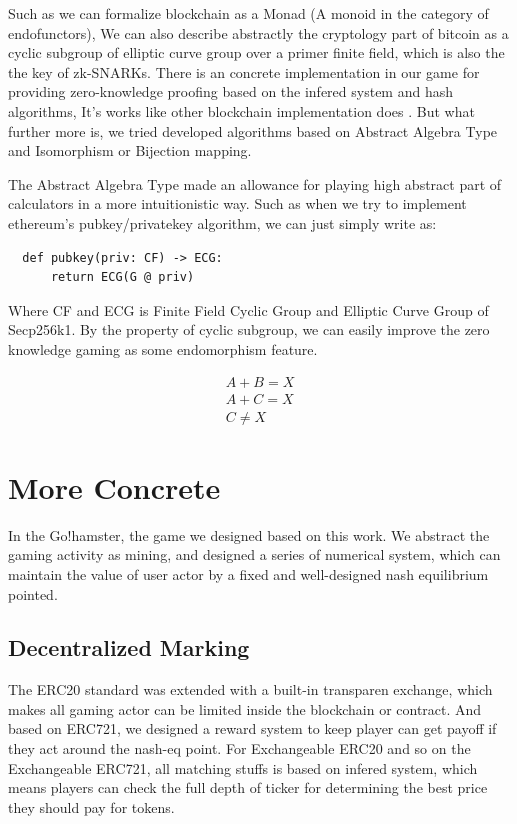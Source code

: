 \documentclass[twocolumn]{article}
\begin{document}
Such as we can formalize blockchain as a Monad (A monoid in the category of endofunctors), We can also describe abstractly the cryptology part of bitcoin as a cyclic subgroup of elliptic curve group over a primer finite field, which is also the the key of zk-SNARKs. There is an concrete implementation in our game for providing zero-knowledge proofing based on the infered system and hash algorithms, It's works like other blockchain implementation does \cite{zcash}. But what further more is, we tried developed algorithms based on Abstract Algebra Type and Isomorphism or Bijection mapping.

The Abstract Algebra Type made an allowance for playing high abstract part of calculators in a more intuitionistic way. Such as when we try to implement ethereum's pubkey/privatekey algorithm, we can just simply write as\cite{klefki}:

\lstset{language=Python}
\begin{lstlisting}
  def pubkey(priv: CF) -> ECG:
      return ECG(G @ priv)
\end{lstlisting}

Where CF and ECG is Finite Field Cyclic Group and Elliptic Curve Group of Secp256k1. By the property of cyclic subgroup, we can easily improve the zero knowledge gaming as some endomorphism feature.

\begin{gather}
  A + B = X \\
  A + C = X \\
  C \neq X
\end{gather}

\section {More Concrete}

In the Go!hamster, the game we designed based on this work. We abstract the gaming activity as mining, and designed a series of numerical system, which can maintain the value of user actor by a fixed and well-designed nash equilibrium pointed. 
\subsection {Decentralized Marking}

The ERC20 standard was extended with a built-in transparen exchange, which makes all gaming actor can be limited inside the blockchain or contract. And based on ERC721, we designed a reward system to keep player can get payoff if they act around the nash-eq point. For Exchangeable ERC20 and so on the Exchangeable ERC721, all matching stuffs is based on infered system, which means players can check the full depth of ticker for determining the best price they should pay for tokens.
\end{document}

